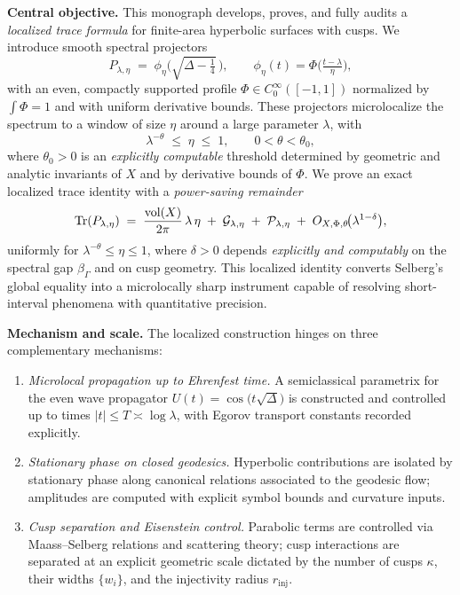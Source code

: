 \medskip

\noindent\textbf{Central objective.}
This monograph develops, proves, and fully audits a \emph{localized trace formula}
for finite-area hyperbolic surfaces with cusps. We introduce smooth spectral
projectors
\[
  P_{\lambda,\eta} \;=\; \phi_\eta\!\Big(\sqrt{\Delta-\tfrac14}\,\Big),
  \qquad \phi_\eta(t)=\Phi\!\Big(\tfrac{t-\lambda}{\eta}\Big),
\]
with an even, compactly supported profile $\Phi\in C_0^\infty([-1,1])$ normalized
by $\int\Phi=1$ and with uniform derivative bounds. These projectors microlocalize
the spectrum to a window of size $\eta$ around a large parameter $\lambda$, with
\[
  \lambda^{-\theta}\;\le\;\eta\;\le\;1, \qquad 0<\theta<\theta_0,
\]
where $\theta_0>0$ is an \emph{explicitly computable} threshold determined by
geometric and analytic invariants of $X$ and by derivative bounds of $\Phi$.
We prove an exact localized trace identity with a \emph{power-saving remainder}
\[
  \operatorname{Tr}(P_{\lambda,\eta})
  \;=\;
  \frac{\operatorname{vol}(X)}{2\pi}\,\lambda\,\eta
  \;+\;
  \mathcal{G}_{\lambda,\eta}
  \;+\;
  \mathcal{P}_{\lambda,\eta}
  \;+\;
  O_{X,\Phi,\theta}\!\big(\lambda^{1-\delta}\big),
\]
uniformly for $\lambda^{-\theta}\le\eta\le 1$, where $\delta>0$ depends
\emph{explicitly and computably} on the spectral gap $\beta_\Gamma$ and on cusp
geometry. This localized identity converts Selberg’s global equality into a
microlocally sharp instrument capable of resolving short-interval phenomena with
quantitative precision.

\medskip

\noindent\textbf{Mechanism and scale.}
The localized construction hinges on three complementary mechanisms:

\begin{enumerate}[label=\arabic*.]
  \item \emph{Microlocal propagation up to Ehrenfest time.}
  A semiclassical parametrix for the even wave propagator
  $U(t)=\cos\!\big(t\sqrt{\Delta}\big)$ is constructed and controlled up to
  times $|t|\le T\asymp \log\lambda$, with Egorov transport constants recorded
  explicitly.

  \item \emph{Stationary phase on closed geodesics.}
  Hyperbolic contributions are isolated by stationary phase along canonical
  relations associated to the geodesic flow; amplitudes are computed with
  explicit symbol bounds and curvature inputs.

  \item \emph{Cusp separation and Eisenstein control.}
  Parabolic terms are controlled via Maass–Selberg relations and scattering
  theory; cusp interactions are separated at an explicit geometric scale
  dictated by the number of cusps $\kappa$, their widths $\{w_i\}$, and the
  injectivity radius $r_{\mathrm{inj}}$.
\end{enumerate}

